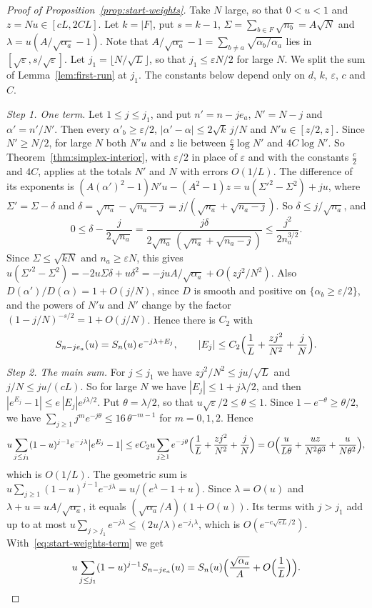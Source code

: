 \begin{proof}[Proof of Proposition~\ref{prop:start-weights}]
Take $N$ large, so that $0<u<1$ and $z=Nu\in[cL,2CL]$. Let $k=|F|$, put
$s=k-1$, $\Sigma=\sum_{b\in F}\sqrt{n_b}=A\sqrt N$ and
$\lambda=u(A/\sqrt{\alpha_a}-1)$. Note that
$A/\sqrt{\alpha_a}-1=\sum_{b\ne a}\sqrt{\alpha_b/\alpha_a}$ lies in
$[\sqrt\varepsilon,s/\sqrt\varepsilon]$. Let $j_1=\lfloor N/\sqrt L\rfloor$, so
that $j_1\le\varepsilon N/2$ for large $N$. We split the sum of
Lemma~\ref{lem:first-run} at $j_1$. The constants below depend only on $d$,
$k$, $\varepsilon$, $c$ and $C$.

\emph{Step 1. One term.} Let $1\le j\le j_1$, and put $n'=n-je_a$, $N'=N-j$ and
$\alpha'=n'/N'$. Then every $\alpha'_b\ge\varepsilon/2$,
$|\alpha'-\alpha|\le2\sqrt k\,j/N$ and $N'u\in[z/2,z]$. Since $N'\ge N/2$, for
large $N$ both $N'u$ and $z$ lie between $\frac c2\log N'$ and $4C\log N'$. So
Theorem~\ref{thm:simplex-interior}, with $\varepsilon/2$ in place of
$\varepsilon$ and with the constants $\frac c2$ and $4C$, applies at the totals
$N'$ and $N$ with errors $O(1/L)$. The difference of its exponents is
$(A(\alpha')^2-1)N'u-(A^2-1)z=u(\Sigma'^2-\Sigma^2)+ju$, where
$\Sigma'=\Sigma-\delta$ and
$\delta=\sqrt{n_a}-\sqrt{n_a-j}=j/(\sqrt{n_a}+\sqrt{n_a-j})$. So
$\delta\le j/\sqrt{n_a}$, and
\[
 0\le\delta-\frac j{2\sqrt{n_a}}
 =\frac{j\delta}{2\sqrt{n_a}\,(\sqrt{n_a}+\sqrt{n_a-j})}
 \le\frac{j^2}{2n_a^{3/2}}.
\]
Since $\Sigma\le\sqrt{kN}$ and $n_a\ge\varepsilon N$, this gives
$u(\Sigma'^2-\Sigma^2)=-2u\Sigma\delta+u\delta^2=-juA/\sqrt{\alpha_a}
+O(zj^2/N^2)$. Also $D(\alpha')/D(\alpha)=1+O(j/N)$, since $D$ is smooth and
positive on $\{\alpha_b\ge\varepsilon/2\}$, and the powers of $N'u$ and $N'$
change by the factor $(1-j/N)^{-s/2}=1+O(j/N)$. Hence there is $C_2$ with
\begin{equation}\label{eq:start-weights-term}
 S_{n-je_a}(u)=S_n(u)\,e^{-j\lambda+E_j},\qquad
 |E_j|\le C_2\Bigl(\frac1L+\frac{zj^2}{N^2}+\frac jN\Bigr).
\end{equation}

\emph{Step 2. The main sum.} For $j\le j_1$ we have $zj^2/N^2\le ju/\sqrt L$ and
$j/N\le ju/(cL)$. So for large $N$ we have $|E_j|\le1+j\lambda/2$, and then
$|e^{E_j}-1|\le e\,|E_j|e^{j\lambda/2}$. Put $\theta=\lambda/2$, so that
$u\sqrt\varepsilon/2\le\theta\le1$. Since $1-e^{-\theta}\ge\theta/2$, we have
$\sum_{j\ge1}j^me^{-j\theta}\le16\,\theta^{-m-1}$ for $m=0,1,2$. Hence
\[
 u\sum_{j\le j_1}(1-u)^{j-1}e^{-j\lambda}\bigl|e^{E_j}-1\bigr|
 \le eC_2u\sum_{j\ge1}e^{-j\theta}\Bigl(\frac1L+\frac{zj^2}{N^2}+\frac jN\Bigr)
 =O\Bigl(\frac u{L\theta}+\frac{uz}{N^2\theta^3}+\frac u{N\theta^2}\Bigr),
\]
which is $O(1/L)$. The geometric sum is
$u\sum_{j\ge1}(1-u)^{j-1}e^{-j\lambda}=u/(e^\lambda-1+u)$. Since $\lambda=O(u)$
and $\lambda+u=uA/\sqrt{\alpha_a}$, it equals $(\sqrt{\alpha_a}/A)(1+O(u))$. Its
terms with $j>j_1$ add up to at most
$u\sum_{j>j_1}e^{-j\lambda}\le(2u/\lambda)e^{-j_1\lambda}$, which is
$O(e^{-c\sqrt{\varepsilon L}/2})$. With~\eqref{eq:start-weights-term} we get
\[
 u\sum_{j\le j_1}(1-u)^{j-1}S_{n-je_a}(u)
 =S_n(u)\Bigl(\frac{\sqrt{\alpha_a}}A+O\Bigl(\frac1L\Bigr)\Bigr).
\]


\end{proof}
